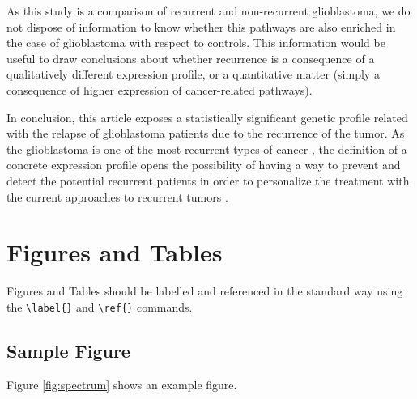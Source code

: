 \documentclass[9pt,twocolumn,twoside]{gsajnl}
\begin{document}
As this study is a comparison of recurrent and non-recurrent glioblastoma, we do not dispose of information to know whether this pathways are also enriched in the case of glioblastoma with respect to controls. This information would be useful to draw conclusions about whether recurrence is a consequence of a qualitatively different expression profile, or a quantitative matter (simply a consequence of higher expression of cancer-related pathways).

In conclusion, this article exposes a statistically significant genetic profile related with the relapse of glioblastoma patients due to the recurrence of the tumor. As the glioblastoma is one of the most recurrent types of cancer \citep{Bleeker2012}, the definition of a concrete expression profile opens the possibility of having a way to prevent and detect the potential recurrent patients in order to personalize the treatment with the current approaches to recurrent tumors \citep{Weller2013}. 

\section*{Figures and Tables}

Figures and Tables should be labelled and referenced in the standard way using the \verb|\label{}| and \verb|\ref{}| commands.

\subsection*{Sample Figure}

Figure \ref{fig:spectrum} shows an example figure.
\end{document}
